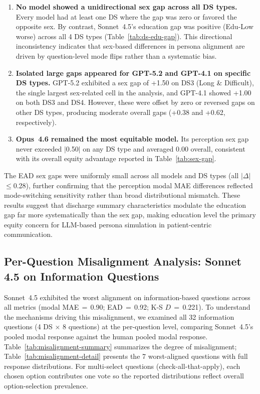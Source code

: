 \begin{enumerate}\itemsep2pt
\item \textbf{No model showed a unidirectional sex gap across all DS types.}
  Every model had at least one DS where the gap was zero or favored the opposite
  sex. By contrast, Sonnet~4.5's education gap was positive (Edu-Low worse)
  across all 4 DS types (Table~\ref{tab:ds-edu-gap}). This directional
  inconsistency indicates that sex-based differences in persona alignment are
  driven by question-level mode flips rather than a systematic bias.

\item \textbf{Isolated large gaps appeared for GPT-5.2 and GPT-4.1 on specific
  DS types.} GPT-5.2 exhibited a sex gap of +1.50 on DS3 (Long \& Difficult),
  the single largest sex-related cell in the analysis, and GPT-4.1 showed +1.00
  on both DS3 and DS4. However, these were offset by zero or reversed gaps on
  other DS types, producing moderate overall gaps (+0.38 and +0.62, respectively).

\item \textbf{Opus~4.6 remained the most equitable model.} Its perception sex gap
  never exceeded $|$0.50$|$ on any DS type and averaged 0.00 overall,
  consistent with its overall equity advantage reported in
  Table~\ref{tab:sex-gap}.
\end{enumerate}

The EAD sex gaps were uniformly small across all models and DS types
(all $|$$\Delta$$|$$\le$0.28), further confirming that the perception modal MAE
differences reflected mode-switching sensitivity rather than broad distributional
mismatch. These results suggest that discharge summary characteristics modulate
the education gap far more systematically than the sex gap, making education
level the primary equity concern for LLM-based persona simulation in
patient-centric communication.


\subsection{Per-Question Misalignment Analysis: Sonnet 4.5 on Information Questions}

Sonnet~4.5 exhibited the worst alignment on information-based questions
across all metrics (modal MAE\,$=$\,0.90; EAD\,$=$\,0.92; K-S $D$\,$=$\,0.221).
To understand the mechanisms driving this misalignment, we examined all 32
information questions (4 DS $\times$ 8 questions) at the per-question level,
comparing Sonnet~4.5's pooled modal response against the human pooled modal
response. Table~\ref{tab:misalignment-summary} summarizes the degree of
misalignment; Table~\ref{tab:misalignment-detail} presents the 7 worst-aligned
questions with full response distributions. For multi-select questions
(check-all-that-apply), each chosen option contributes one vote so the
reported distributions reflect overall option-selection prevalence.

